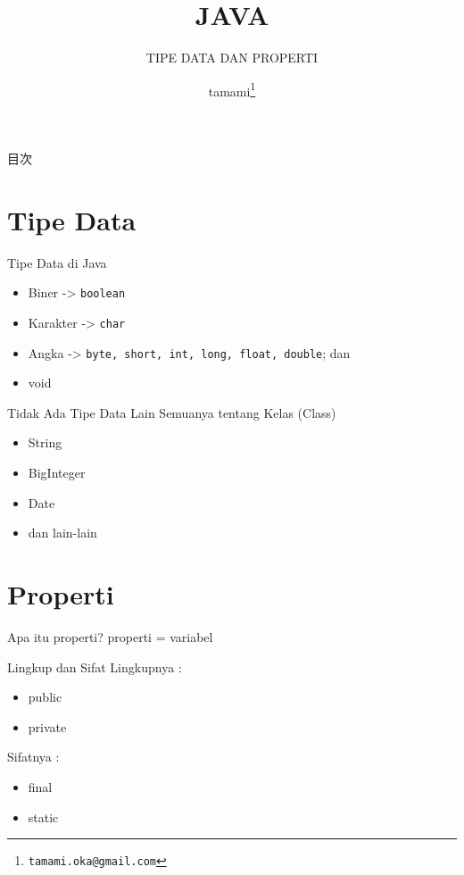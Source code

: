 \documentclass{beamer}
\title{JAVA}
\subtitle{TIPE DATA DAN PROPERTI}
\author{tamami\footnote{\texttt{tamami.oka@gmail.com}}}
\begin{document}
\begin{frame}
  \maketitle
\end{frame}

\begin{frame}{目次}
  \tableofcontents
\end{frame}

\section{Tipe Data}

\begin{frame}{Tipe Data di Java}
	\begin{itemize}
		\item Biner -> \texttt{boolean}
		\item Karakter -> \texttt{char}
		\item Angka -> \texttt{byte, short, int, long, float, double}; dan
		\item void
	\end{itemize}
\end{frame}

\begin{frame}{Tidak Ada Tipe Data Lain}
  Semuanya tentang Kelas (Class)
  
  \begin{itemize}
  	\item String
  	\item BigInteger
  	\item Date
  	\item dan lain-lain
  \end{itemize}
\end{frame}


\section{Properti}
\begin{frame}{Apa itu properti?}
	properti = variabel
\end{frame}

\begin{frame}{Lingkup dan Sifat}
	Lingkupnya :
	\begin{itemize}
		\item public 
		\item private
	\end{itemize}
	
	Sifatnya :
	\begin{itemize}
		\item final
		\item static
	\end{itemize}
\end{frame}
\end{document}
